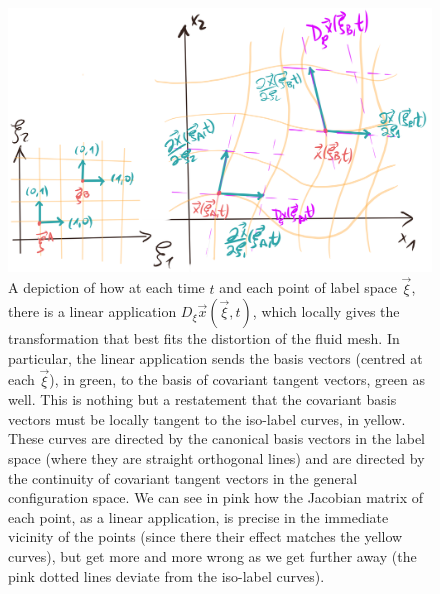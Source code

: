 \documentclass[11pt, a4paper]{article} %
\begin{document}
\begin{figure}[h!]
  \centering
    \includegraphics[width=0.65\linewidth]{4each_locality.png}
  \caption{A depiction of how at each time $t$ and each point of label space $\vec{\xi}$, there is a linear application $D_\xi\vec{x}(\vec{\xi},t)$, which locally gives the transformation that best fits the distortion of the fluid mesh. In particular, the linear application sends the basis vectors (centred at each $\vec{\xi}$), in green, to the basis of covariant tangent vectors, green as well. This is nothing but a restatement that the covariant basis vectors must be locally tangent to the iso-label curves, in yellow. These curves are directed by the canonical basis vectors in the label space (where they are straight orthogonal lines) and are directed by the continuity of covariant tangent vectors in the general configuration space. We can see in pink how the Jacobian matrix of each point, as a linear application, is precise in the immediate vicinity of the points (since there their effect matches the yellow curves), but get more and more wrong as we get further away (the pink dotted lines deviate from the iso-label curves). }
  \label{fig:localContinuum}
\end{figure}
\end{document}
